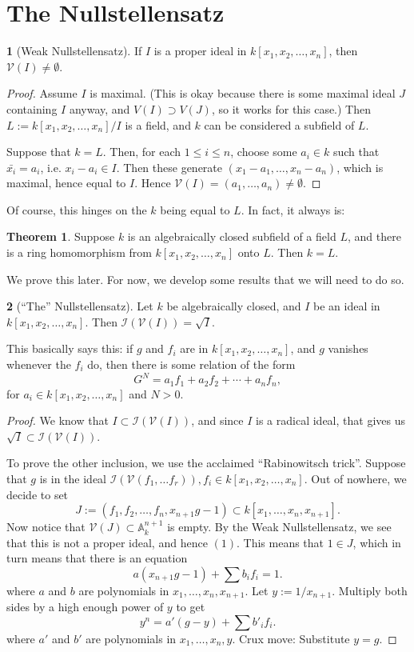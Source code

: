 \documentclass{book}
\newcommand{\I}[1]{\mathcal{I}(#1)}
\newcommand{\V}[1]{\mathcal{V}(#1)}
\newcommand{\kn}{k[x_1,x_2,\ldots,x_n]}
\theoremstyle{definition}
\newtheorem*{thmsmall}{Theorem}
\theoremstyle{block}
\theoremstyle{thm}
\newtheorem*{thm}{}
\begin{document}
\section{The Nullstellensatz}
\begin{thm}[Weak Nullstellensatz]
  If $I$ is a proper ideal in $\kn$, then $\V I\neq\emptyset$.
\end{thm}
\begin{proof}
  Assume $I$ is maximal. (This is okay because there is some maximal ideal $J$
  containing $I$ anyway, and $V(I)\supset V(J)$, so it works for this case.)
  Then $L:=\kn/I$ is a field, and $k$ can be considered a subfield of $L$.\par
  Suppose that $k=L$. Then, for each $1\leq i\leq n$, choose some $a_i\in k$
  such that $\bar{x_i}=a_i$, i.e. $x_i-a_i\in I$. Then these generate
  $(x_1-a_1,\ldots,x_n-a_n)$, which is maximal, hence equal to $I$. Hence $\V I
  = {(a_1,\ldots,a_n)}\neq\emptyset$.
\end{proof}
Of course, this hinges on the $k$ being equal to $L$. In fact, it always is:
\begin{thmsmall}
  Suppose $k$ is an algebraically closed subfield of a field $L$, and there is a
  ring homomorphism from $\kn$ onto $L$. Then $k=L$.
\end{thmsmall}
We prove this later. For now, we develop some results that we will need to do so.
\begin{thm}[``The'' Nullstellensatz]
  Let $k$ be algebraically closed, and $I$ be an ideal in $\kn$. Then $\I{\V I}
  = \sqrt I$.
\end{thm}
This basically says this: if $g$ and $f_i$ are in $\kn$, and $g$ vanishes
whenever the $f_i$ do, then there is some relation of the form
\[G^N = a_1f_1+a_2f_2+\cdots+a_nf_n,\]
for $a_i\in\kn$ and $N>0$.
\begin{proof}
  We know that $I\subset \I{\V I}$, and since $I$ is a radical ideal, that gives
  us $\sqrt I\subset\I{\V I}$.\par
  To prove the other inclusion, we use the acclaimed ``Rabinowitsch trick''. 
  Suppose that $g$ is in the ideal $\I{\V{f_1,\ldots f_r}}, f_i\in\kn$. Out of
  nowhere, we decide to set
  \[J:=(f_1,f_2,\ldots,f_n,x_{n+1}g-1)\subset k[x_1,\ldots,x_n,x_{n+1}].\]
  Now notice that $\V J\subset{\mathbb{A}_k^{n+1}}$ is empty. By the Weak Nullstellensatz,
  we see that this is not a proper ideal, and hence $(1)$. This means that $1\in
  J$, which in turn means that there is an equation
  \[a(x_{n+1}g-1)+\sum b_if_i = 1.\]
  where $a$ and $b$ are polynomials in $x_1,\ldots,x_n,x_{n+1}$.
  Let $y:=1/x_{n+1}$. Multiply both sides by a high enough power of $y$ to get
  \[y^n = a'(g-y)+\sum {b'}_if_i.\]
  where $a'$ and $b'$ are polynomials in $x_1,\ldots,x_n,y$. 
  Crux move: Substitute $y=g$.
\end{proof}
\end{document}
